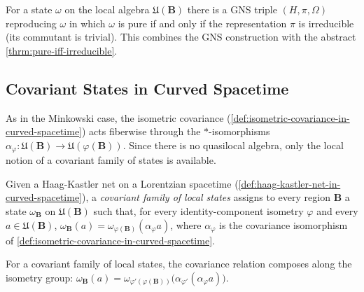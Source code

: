 \begin{theorem}
    \label{thrm:pure-iff-irreducible-in-curved-spacetime}
    \leanok
    For a state $\omega$ on the local algebra $\mathfrak{U}(\mathbf{B})$ there is a GNS triple $(H, \pi, \Omega)$ reproducing $\omega$ in which $\omega$ is pure if and only if the representation $\pi$ is irreducible (its commutant is trivial). This combines the GNS construction with the abstract \ref{thrm:pure-iff-irreducible}.
\end{theorem}

\subsection{Covariant States in Curved Spacetime}

As in the Minkowski case, the isometric covariance (\ref{def:isometric-covariance-in-curved-spacetime}) acts fiberwise through the $*$-isomorphisms $\alpha_\varphi : \mathfrak{U}(\mathbf{B}) \to \mathfrak{U}(\varphi(\mathbf{B}))$. Since there is no quasilocal algebra, only the local notion of a covariant family of states is available.

\begin{definition}
    \label{def:covariant-state-family-in-curved-spacetime}
    \leanok
    Given a Haag-Kastler net on a Lorentzian spacetime (\ref{def:haag-kastler-net-in-curved-spacetime}), a \emph{covariant family of local states} assigns to every region $\mathbf{B}$ a state $\omega_{\mathbf{B}}$ on $\mathfrak{U}(\mathbf{B})$ such that, for every identity-component isometry $\varphi$ and every $a \in \mathfrak{U}(\mathbf{B})$, $\omega_{\mathbf{B}}(a) = \omega_{\varphi(\mathbf{B})}(\alpha_\varphi a)$, where $\alpha_\varphi$ is the covariance isomorphism of \ref{def:isometric-covariance-in-curved-spacetime}.
\end{definition}

\begin{lemma}
    \label{lmm:covariant-state-family-compose-in-curved-spacetime}
    \leanok
    For a covariant family of local states, the covariance relation composes along the isometry group: $\omega_{\mathbf{B}}(a) = \omega_{\varphi'(\varphi(\mathbf{B}))}\big(\alpha_{\varphi'}(\alpha_\varphi a)\big)$.
\end{lemma}

